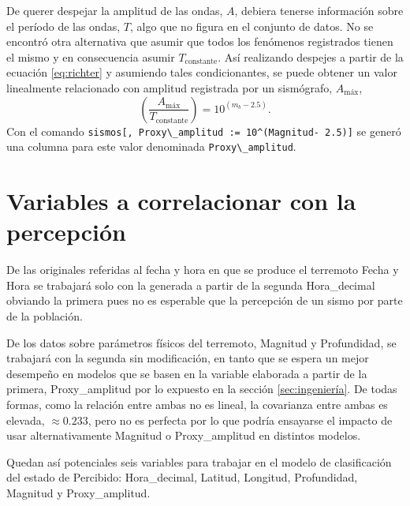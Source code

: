 \documentclass[a4paper]{report}
\begin{document}
De querer despejar la amplitud de las ondas, \(A\), debiera tenerse información sobre el período de las ondas, \(T\), algo que no figura en el conjunto de datos.
No se encontró otra alternativa que asumir que todos los fenómenos registrados tienen el mismo y en consecuencia asumir \(T_\text{constante}\).
Así realizando despejes a partir de la ecuación \ref{eq:richter} y asumiendo tales condicionantes, se puede obtener un valor linealmente relacionado con amplitud registrada por un sismógrafo, \(A_\text{máx}\),
\begin{equation}
	\left( \frac{A_\text{máx}}{T_\text{constante}} \right) = 10^{(m_b - 2.5)}.
	\label{eq:linealizacionMagnitud_final} 
\end{equation}
Con el comando \verb'sismos[, Proxy\_amplitud := 10^(Magnitud- 2.5)]' se generó una columna para este valor denominada \verb'Proxy\_amplitud'.




\section{Variables a correlacionar con la percepción}
De las originales referidas al fecha y hora en que se produce el terremoto Fecha y Hora se trabajará solo con la generada a partir de la segunda Hora\_decimal obviando la primera pues no es esperable que la percepción de un sismo por parte de la población.

De los datos sobre parámetros físicos del terremoto, Magnitud y Profundidad, se trabajará con la segunda sin modificación, en tanto que se espera un mejor desempeño en modelos que se basen en la variable elaborada a partir de la primera, Proxy\_amplitud por lo expuesto en la sección \ref{sec:ingeniería}.
De todas formas, como la relación entre ambas no es lineal, la covarianza entre ambas es elevada, \(\approx 0.233\), pero no es perfecta por lo que podría ensayarse el impacto de usar alternativamente Magnitud o Proxy\_amplitud en distintos modelos.

Quedan así potenciales seis variables para trabajar en el modelo de clasificación del estado de Percibido: Hora\_decimal, Latitud, Longitud, Profundidad, Magnitud y Proxy\_amplitud.
\end{document}
